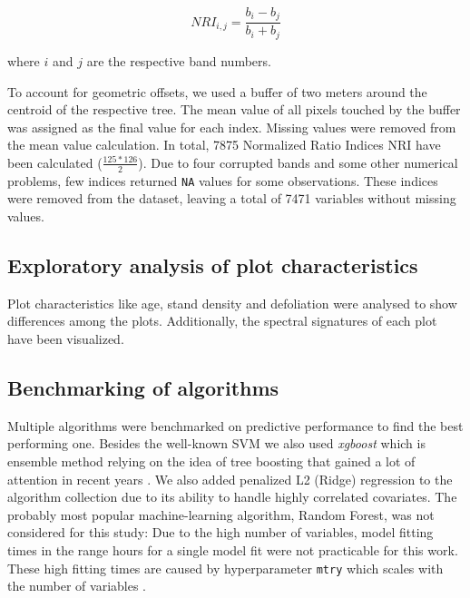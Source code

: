 \documentclass[review]{elsarticle}
\begin{document}
\begin{equation}
	NRI_{i,j} = \frac{b_{i} - b_{j}}{b_{i} + b_{j}}
\end{equation}

\noindent
where $i$ and $j$ are the respective band numbers.

To account for geometric offsets, we used a buffer of two meters around the centroid of the respective tree.
The mean value of all pixels touched by the buffer was assigned as the final value for each index.
Missing values were removed from the mean value calculation.
In total, 7875 Normalized Ratio Indices NRI have been calculated ($\frac{125*126}{2}$).
Due to four corrupted bands and some other numerical problems, few indices returned \texttt{NA} values for some observations.
These indices were removed from the dataset, leaving a total of 7471 variables without missing values.

\subsection{Exploratory analysis of plot characteristics}

Plot characteristics like age, stand density and defoliation were analysed to show differences among the plots.
Additionally, the spectral signatures of each plot have been visualized.

\subsection{Benchmarking of algorithms}

Multiple algorithms were benchmarked on predictive performance to find the best performing one.
Besides the well-known \ac{SVM} \citep{Vapnik1998} we also used \textit{xgboost} which is ensemble method relying on the idea of tree boosting that gained a lot of attention in recent years \citep{chenXGBoostScalableTree2016}.
We also added penalized L2 (Ridge) regression to the algorithm collection due to its ability to handle highly correlated covariates.
The probably most popular machine-learning algorithm, Random Forest, was not considered for this study: Due to the high number of variables, model fitting times in the range hours for a single model fit were not practicable for this work.
These high fitting times are caused by hyperparameter \texttt{mtry} which scales with the number of variables \citep{Probst2018b}.

\end{document}
